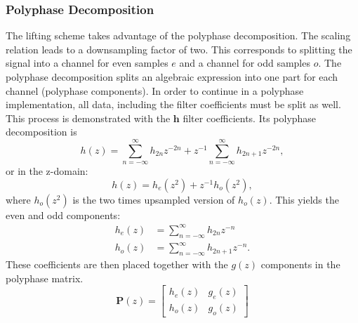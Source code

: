 \begin{refsection}
\subsubsection{Polyphase Decomposition \label{fpga:polyphase}}

The lifting scheme takes advantage of the polyphase decomposition.
The scaling relation leads to a downsampling factor of two.
This corresponds to splitting the signal into a channel for even samples $e$ and a channel for odd samples $o$.
The polyphase decomposition splits an algebraic expression into one part for each channel (polyphase components).
In order to continue in a polyphase implementation, all data, including the filter coefficients must be split as well.
This process is demonstrated with the $\bm h$ filter coefficients.
Its polyphase decomposition is
\begin{equation}
	h(z) = \sum_{n=-\infty}^{\infty} h_{2n} z^{-2n} + z^{-1} \sum_{n=-\infty}^{\infty} h_{2n+1} z^{-2n},
\end{equation}
or in the z-domain:
\begin{equation}
	h(z)=h_{e}(z^2) + z^{-1} h_o(z^2),
\end{equation}
where $h_o(z^2)$ is the two times upsampled version of $h_o(z)$.
This yields the even and odd components:
\begin{align}
	h_e(z) &= \sum_{n=-\infty}^{\infty} h_{2n}z^{-n}
	\\
	h_o(z) &= \sum_{n=-\infty}^{\infty} h_{2n+1}z^{-n}.
\end{align}
These coefficients are then placed together with the $g(z)$ components in the polyphase matrix.
\begin{equation}
	\bm P(z) = 
	\begin{bmatrix}
	h_e(z) & g_e(z) \\
	h_o(z) & g_o(z)
	\end{bmatrix}
\end{equation}


\end{refsection}
